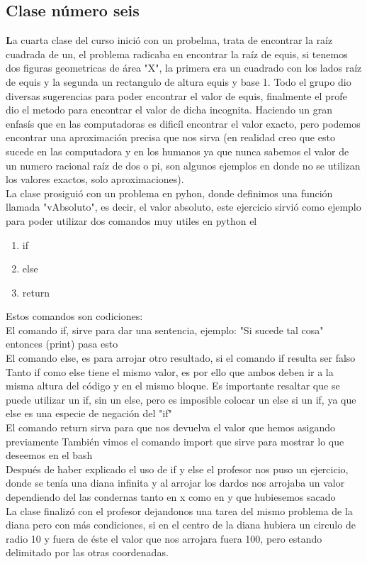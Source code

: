 \documentclass{book}
\begin{document}
\begin{enumerate}
\begin{enumerate}
\chapter{Clase número seis}
\textbf La cuarta clase del curso inició con un probelma, trata de encontrar la raíz cuadrada de un, el problema radicaba en encontrar la raíz de equis, si tenemos dos  figuras geometricas de área "X", la primera era un cuadrado con los lados raíz de equis y la segunda un rectangulo de altura equis y base 1. Todo el grupo dio diversas sugerencias para poder encontrar el valor de equis, finalmente el profe dio el metodo para encontrar el valor de dicha incognita. Haciendo un gran enfasís que en las computadoras es dificíl encontrar el valor exacto, pero podemos encontrar una aproximación precisa que nos sirva (en realidad creo que esto sucede en las computadora y en los humanos ya que nunca sabemos el valor de un numero racional raíz de dos o pi, son algunos ejemplos en donde no se utilizan los valores exactos, solo aproximaciones).\\
La clase prosiguió con un problema en pyhon, donde definimos una función llamada "vAbsoluto", es decir, el valor absoluto, este ejercicio sirvió como ejemplo para poder utilizar dos comandos muy utiles en python el
\begin{enumerate}
	\item if
	\item else
	\item return
\end{enumerate}
Estos comandos son codiciones:\\
El comando if, sirve para dar una sentencia, ejemplo: "Si sucede tal cosa" entonces (print) pasa esto\\
El comando else, es para arrojar otro resultado, si el comando if resulta ser falso\\
Tanto if como else tiene el mismo valor, es por ello que ambos deben ir a la misma altura del código y en el mismo bloque. Es importante resaltar que se puede utilizar un if, sin un else, pero es imposible colocar un else si un if, ya que else es una especie de negación del "if"\\
El comando return sirva para que nos devuelva el valor que hemos asigando previamente
También vimos el comando import que sirve para mostrar lo que deseemos en el bash\\

Después de haber explicado el uso de if y else el profesor nos puso un ejercicio, donde se tenía una diana infinita y al arrojar los dardos nos arrojaba un valor dependiendo del las condernas tanto en x como en y que hubiesemos sacado\\
La clase finalizó con el profesor dejandonos una tarea del mismo problema de la diana pero con más condiciones, si en el centro de la diana hubiera un circulo de radio 10 y fuera de éste el valor que nos arrojara fuera 100, pero estando delimitado por las otras coordenadas.


\end{enumerate}
\end{enumerate}
\end{document}

